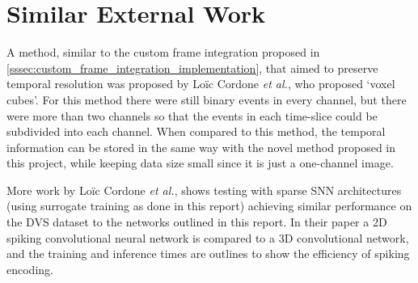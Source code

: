 \section{Similar External Work}

A method, similar to the custom frame integration proposed in \cref{sssec:custom_frame_integration_implementation}, that aimed to preserve temporal resolution was proposed by Lo\"ic Cordone \textit{et al.}, who proposed `voxel cubes'\cite{MiniVovelCubes}. For this method there were still binary events in every channel, but there were more than two channels so that the events in each time-slice could be subdivided into each channel. When compared to this method, the temporal information can be stored in the same way with the novel method proposed in this project, while keeping data size small since it is just a one-channel image. 

More work by Lo\"ic Cordone \textit{et al.}\cite{OtherSnnWork}, shows testing with sparse SNN architectures (using surrogate training as done in this report) achieving similar performance on the DVS dataset to the networks outlined in this report. In their paper a 2D spiking convolutional neural network is compared to a 3D convolutional network, and the training and inference times are outlines to show the efficiency of spiking encoding.
